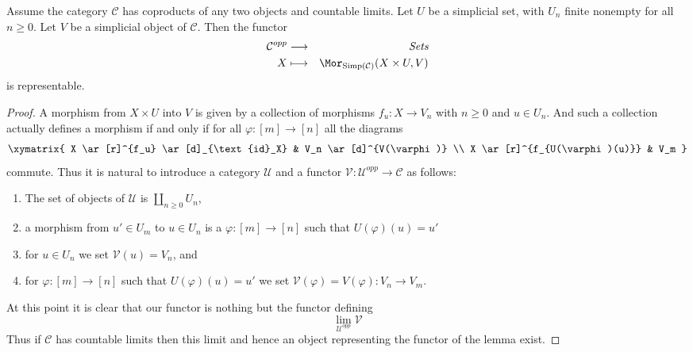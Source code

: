 \begin{lemma}
\label{lemma-exists-hom-0-from-simplicial-set}
Assume the category $\mathcal{C}$
has coproducts of any two objects and countable
limits. Let $U$ be a simplicial set, with $U_n$ finite nonempty
for all $n \geq 0$.
Let $V$ be a simplicial object of $\mathcal{C}$.
Then the functor
\begin{eqnarray*}
\mathcal{C}^{opp} & \longrightarrow & \textit{Sets} \\
X
& \longmapsto &
\Mor_{\text{Simp}(\mathcal{C})}(X \times U, V)
\end{eqnarray*}
is representable.
\end{lemma}

\begin{proof}
A morphism from $X \times U$ into $V$ is given by a collection
of morphisms $f_u : X \to V_n$ with $n \geq 0$ and $u \in U_n$.
And such a collection actually defines a morphism if and only
if for all $\varphi : [m] \to [n]$ all the diagrams
$$
\xymatrix{
X \ar[r]^{f_u} \ar[d]_{\text{id}_X} & V_n \ar[d]^{V(\varphi)} \\
X \ar[r]^{f_{U(\varphi)(u)}} & V_m
}
$$
commute. Thus it is natural to introduce a category
$\mathcal{U}$ and a functor
$\mathcal{V} : \mathcal{U}^{opp} \to \mathcal{C}$
as follows:
\begin{enumerate}
\item The set of objects of $\mathcal{U}$ is
$\coprod_{n \geq 0} U_n$,
\item a morphism from $u' \in U_m$ to $u \in U_n$
is a $\varphi : [m] \to [n]$ such that $U(\varphi)(u) = u'$
\item for $u \in U_n$ we set $\mathcal{V}(u) = V_n$, and
\item for $\varphi : [m] \to [n]$ such that $U(\varphi)(u) = u'$
we set $\mathcal{V}(\varphi) = V(\varphi) : V_n \to V_m$.
\end{enumerate}
At this point it is clear that our functor is nothing but the
functor defining
$$
\lim_{\mathcal{U}^{opp}} \mathcal{V}
$$
Thus if $\mathcal{C}$ has countable limits then this limit
and hence an object representing the functor of the lemma
exist.
\end{proof}
